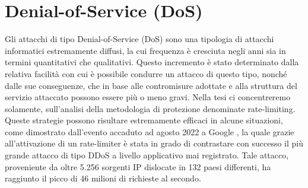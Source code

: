 \section{Denial-of-Service (DoS)}

Gli attacchi di tipo Denial-of-Service (DoS) sono una tipologia di attacchi informatici estremamente diffusi, la cui
frequenza è cresciuta negli anni sia in termini quantitativi che qualitativi. Questo incremento è stato determinato
dalla relativa facilità con cui è possibile condurre un attacco di questo tipo, nonché dalle sue conseguenze, che in
base alle contromisure adottate e alla struttura del servizio attaccato possono essere più o meno gravi. Nella tesi ci
concentreremo solamente, sull’analisi della metodologia di protezione denominate rate-limiting. Queste strategie possono
risultare estremamente efficaci in alcune situazioni, come dimostrato dall’evento accaduto ad agosto 2022 a Google \cite{google_ddos},
la quale grazie all’attivazione di un rate-limiter è stata in grado di contrastare con successo il più grande attacco di tipo
DDoS a livello applicativo mai registrato. Tale attacco, proveniente da oltre 5.256 sorgenti IP dislocate in 132 paesi
differenti, ha raggiunto il picco di 46 milioni di richieste al secondo. 


